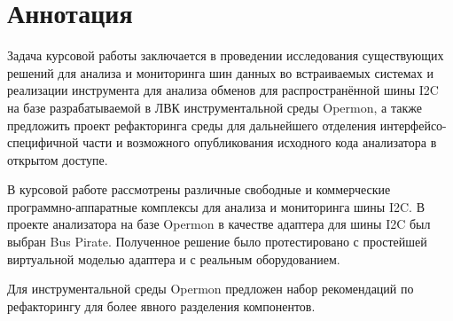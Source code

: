\section{Аннотация}

Задача курсовой работы заключается в проведении исследования существующих решений для анализа и мониторинга шин данных во встраиваемых системах и реализации инструмента для анализа обменов для распространённой шины I2C на базе разрабатываемой в ЛВК инструментальной среды Opermon, а также предложить проект рефакторинга среды для дальнейшего отделения интерфейсо-специфичной части и возможного опубликования исходного кода анализатора в открытом доступе.

В курсовой работе рассмотрены различные свободные и коммерческие программно-аппаратные комплексы для анализа и мониторинга шины I2C. В проекте анализатора на базе Opermon в качестве адаптера для шины I2C был выбран Bus Pirate. Полученное решение было протестировано с простейшей виртуальной моделью адаптера и с реальным оборудованием.

Для инструментальной среды Opermon предложен набор рекомендаций по рефакторингу для более явного разделения компонентов.

